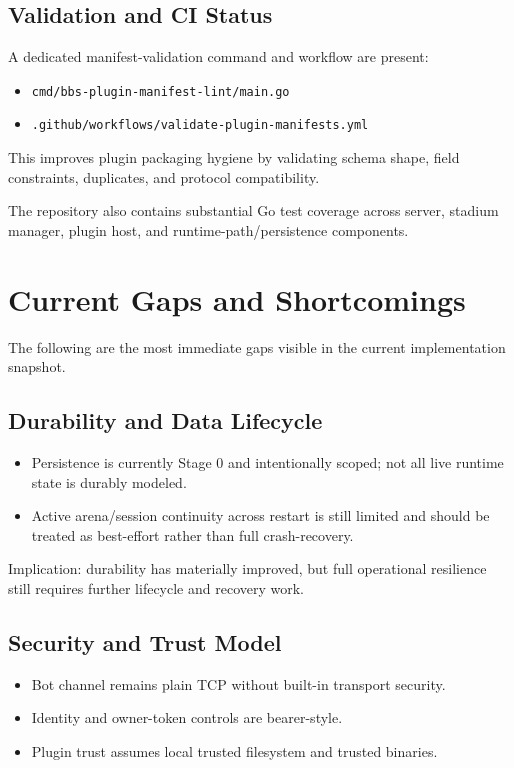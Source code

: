 \documentclass[11pt]{article}
\begin{document}
\subsection{Validation and CI Status}
A dedicated manifest-validation command and workflow are present:
\begin{itemize}[leftmargin=*]
  \item \texttt{cmd/bbs-plugin-manifest-lint/main.go}
  \item \texttt{.github/workflows/validate-plugin-manifests.yml}
\end{itemize}

This improves plugin packaging hygiene by validating schema shape, field constraints, duplicates, and protocol compatibility.

The repository also contains substantial Go test coverage across server, stadium manager, plugin host, and runtime-path/persistence components.

\section{Current Gaps and Shortcomings}
The following are the most immediate gaps visible in the current implementation snapshot.

\subsection{Durability and Data Lifecycle}
\begin{itemize}[leftmargin=*]
  \item Persistence is currently Stage 0 and intentionally scoped; not all live runtime state is durably modeled.
  \item Active arena/session continuity across restart is still limited and should be treated as best-effort rather than full crash-recovery.
\end{itemize}

Implication: durability has materially improved, but full operational resilience still requires further lifecycle and recovery work.

\subsection{Security and Trust Model}
\begin{itemize}[leftmargin=*]
  \item Bot channel remains plain TCP without built-in transport security.
  \item Identity and owner-token controls are bearer-style.
  \item Plugin trust assumes local trusted filesystem and trusted binaries.
\end{itemize}
\end{document}
